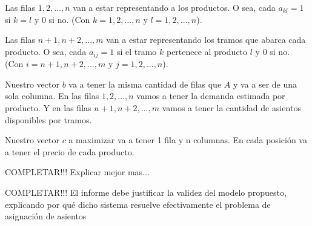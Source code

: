 Las filas $1,2,...,n$ van a estar representando a los productos. O sea, cada $a_{kl} = 1$ si $k = l$ y $0$ si no. (Con $k = 1,2,...,n$ y $l = 1,2,...,n$).

Las filas $n+1,n+2,...,m$ van a estar representando los tramos que abarca cada producto. O sea, cada $a_{ij} = 1$ si el tramo $k$ pertenece al producto $l$ y $0$ si no. (Con $i = n+1,n+2,...,m$ y $j = 1,2,...,n$).

Nuestro vector $b$ va a tener la misma cantidad de filas que $A$ y va a ser de una sola columna. En las filas $1,2,...,n$ vamos a tener la demanda estimada por producto.
Y en las filas $n+1,n+2,...,m$ vamos a tener la cantidad de asientos disponibles por tramos.

Nuestro vector $c$ a maximizar va a tener 1 fila y n columnas. En cada posici\'on va a tener el precio de cada producto.

COMPLETAR!!! Explicar mejor mas...

COMPLETAR!!! El informe debe justificar la validez del modelo propuesto, explicando por qu\'e dicho sistema resuelve efectivamente el problema de asignaci\'on de asientos


